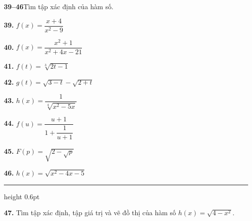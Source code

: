 \documentclass[10pt,letterpaper]{article}
\begin{document}
\begin{minipage}[t]{0.485\textwidth}

    \noindent
    \textbf{\textsf{\color{stewartcyan}39--46}}\quad Tìm tập xác định của hàm số.

    \vspace{0.33em}
    \noindent
    \begin{minipage}[t]{0.48\textwidth}
        \textbf{39.} $f(x) = \dfrac{x + 4}{x^2 - 9}$
    \end{minipage}%
    \hfill
    \begin{minipage}[t]{0.48\textwidth}
        \textbf{40.} $f(x) = \dfrac{x^2 + 1}{x^2 + 4x - 21}$
    \end{minipage}

    \vspace{0.49em}
    \noindent
    \begin{minipage}[t]{0.48\textwidth}
        \textbf{41.} $f(t) = \sqrt[3]{2t - 1}$
    \end{minipage}%
    \hfill
    \begin{minipage}[t]{0.48\textwidth}
        \textbf{42.} $g(t) = \sqrt{3 - t} - \sqrt{2 + t}$
    \end{minipage}

    \vspace{0.49em}
    \noindent
    \begin{minipage}[t]{0.48\textwidth}
        \textbf{43.} $h(x) = \dfrac{1}{\sqrt[4]{x^2 - 5x}}$
    \end{minipage}%
    \hfill
    \begin{minipage}[t]{0.48\textwidth}
        \textbf{44.} $f(u) = \dfrac{u + 1}{1 + \dfrac{1}{u + 1}}$
    \end{minipage}

    \vspace{0.49em}
    \noindent
    \begin{minipage}[t]{0.48\textwidth}
        \textbf{45.} $F(p) = \sqrt{2 - \sqrt{p}}$
    \end{minipage}%
    \hfill
    \begin{minipage}[t]{0.48\textwidth}
        \textbf{46.} $h(x) = \sqrt{x^2 - 4x - 5}$
    \end{minipage}

    \vspace{0.66em}
    {\color{stewartcyan}\hrule height 0.6pt}
    \vspace{0.49em}

    \noindent
    \textbf{47.} Tìm tập xác định, tập giá trị và vẽ đồ thị của hàm số $h(x) = \sqrt{4 - x^2}$.


\end{minipage}
\end{document}
